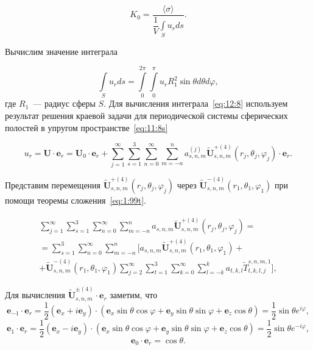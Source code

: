 \begin{equation}
K_0=\frac{\langle\sigma\rangle}{\dfrac{1}{V}\int\limits_S u_r ds}.
\label{eq:12:7}
\end{equation}

Вычислим значение интеграла

\begin{equation}
\int\limits_S u_r ds=\int\limits_0^{2\pi}\int\limits_0^\pi u_r R_1^2\sin\theta d\theta d\varphi,
\label{eq:12:8}
\end{equation}
где $R_1$~--- радиус сферы $S$. Для вычисления интеграла~\eqref{eq:12:8} используем результат решения краевой задачи для периодической системы сферических полостей в упругом пространстве~\eqref{eq:11:8s}

\begin{equation}
u_r=\mathbf{U}\cdot\mathbf{e}_r=\mathbf{U}_0\cdot\mathbf{e}_r+\sum\limits_{j=1}^\infty
\sum\limits_{s=1}^3\sum\limits_{n=0}^\infty\sum\limits_{m=-n}^n a_{s,n,m}^{(j)}\mathbf{\tilde U}_{s,n,m}^{+(4)}(r_j,\theta_j,\varphi_j)\cdot\mathbf{e}_r.
\label{eq:12:9}
\end{equation}

Представим перемещения $\mathbf{\tilde U}_{s,n,m}^{+(4)}(r_j,\theta_j,\varphi_j)$ через $\mathbf{\tilde U}_{s,n,m}^{-(4)}(r_1,\theta_1,\varphi_1)$ при помощи теоремы сложения~\eqref{eq:1:99t}.

\begin{multline}
\sum\limits_{j=1}^\infty
\sum\limits_{s=1}^3\sum\limits_{n=0}^\infty\sum\limits_{m=-n}^n a_{s,n,m}\mathbf{\tilde U}_{s,n,m}^{+(4)}(r_j,\theta_j,\varphi_j)= \\
=\sum\limits_{s=1}^3\sum\limits_{n=0}^\infty\sum\limits_{m=-n}^n\bigg\lbrack a_{s,n,m}\mathbf{\tilde U}_{s,n,m}^{+(4)}(r_1,\theta_1,\varphi_1)+ \\
+\mathbf{\tilde U}_{s,n,m}^{-(4)}(r_1,\theta_1,\varphi_1)\sum\limits_{j=2}^\infty\sum\limits_{t=1}^3\sum\limits_{k=0}^\infty\sum\limits_{l=-k}^k a_{t,k,l}\tilde T_{t,k,l,j}^{s,n,m,1}\bigg\rbrack,
\label{eq:12:10}
\end{multline}

Для вычисления $\mathbf{\tilde U}_{s,n,m}^{\pm(4)}\cdot\mathbf{e}_r$ заметим, что
$$
\mathbf{e}_{-1}\cdot\mathbf{e}_r=\frac{1}{2}(\mathbf{e}_x+i\mathbf{e}_y)\cdot(\mathbf{e}_x\sin\theta\cos\varphi+
\mathbf{e}_y\sin\theta\sin\varphi+\mathbf{e}_z\cos\theta)=\frac{1}{2}\sin\theta e^{i\varphi},
$$
$$
\mathbf{e}_1\cdot\mathbf{e}_r=\frac{1}{2}(\mathbf{e}_x-i\mathbf{e}_y)\cdot(\mathbf{e}_x\sin\theta\cos\varphi+
\mathbf{e}_y\sin\theta\sin\varphi+\mathbf{e}_z\cos\theta)=\frac{1}{2}\sin\theta e^{-i\varphi},
$$
$$
\mathbf{e}_0\cdot\mathbf{e}_r=\cos\theta.
$$

